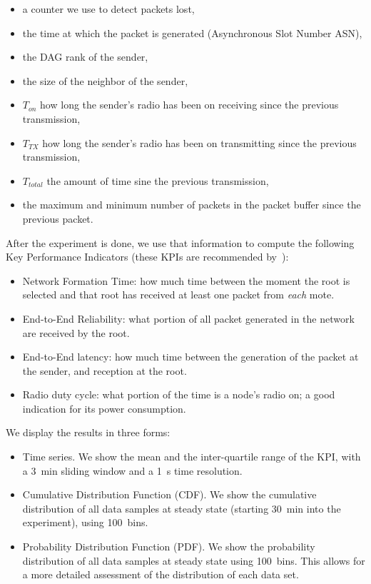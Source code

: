 \documentclass[sensors,article,submit,moreauthors,pdftex]{Definitions/mdpi}
\begin{document}
\begin{itemize}
    \item a counter we use to detect packets lost,
    \item the time at which the packet is generated (Asynchronous Slot Number ASN),
    \item the DAG rank of the sender,
    \item the size of the neighbor of the sender,
    \item $T_{on}$ how long the sender's radio has been on receiving    since the previous transmission,
    \item $T_{TX}$ how long the sender's radio has been on transmitting since the previous transmission,
    \item $T_{total}$ the amount of time sine the previous transmission,
    \item the maximum and minimum number of packets in the packet buffer since the previous packet.
\end{itemize}


After the experiment is done, we use that information to compute the following Key Performance Indicators (these KPIs are recommended by~\cite{vucinic20key}):

\begin{itemize}
    \item Network Formation Time:
        how much time between the moment the root is selected and that root has received at least one packet from \textit{each} mote. 
    \item End-to-End Reliability:
        what portion of all packet generated in the network are received by the root. 
    \item End-to-End latency:
        how much time between the generation of the packet at the sender, and reception at the root.
    \item Radio duty cycle:
        what portion of the time is a node's radio on; a good indication for its power consumption.
\end{itemize}


We display the results in three forms:

\begin{itemize}
    \item Time series.
        We show the mean and the inter-quartile range of the KPI,
            with a 3~min sliding window and a 1~s time resolution. 
    \item Cumulative Distribution Function (CDF).
        We show the cumulative distribution of all data samples at steady state (starting 30~min into the experiment), using 100~bins.
    \item Probability Distribution Function (PDF).
        We show the probability distribution of all data samples at steady state using 100~bins.
        This allows for a more detailed assessment of the distribution of each data set. 
\end{itemize}
\end{document}
